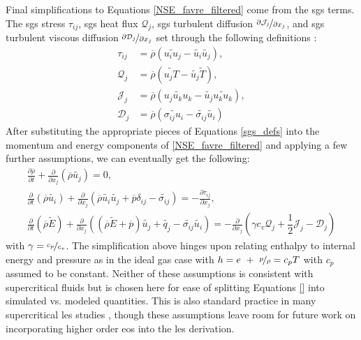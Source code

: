 Final simplifications to Equations \ref{NSE_favre_filtered} come from the \gls{sgs} terms. The \gls{sgs} stress $\tau_{ij}$, \gls{sgs} heat flux $\mathcal{Q}_j$, \gls{sgs} turbulent diffusion $\nicefrac{\partial \mathcal{J}_j}{\partial x_j}$, and \gls{sgs} turbulent viscous diffusion $\nicefrac{\partial \mathcal{D}_j}{\partial x_j}$ set through the following definitions \cite{}:
\begin{equation} \label{sgs_defs}
\begin{aligned}
\tau_{ij} &= \overline{\rho}\left(\widetilde{u_i u_j} - \widetilde{u_i}\widetilde{u_j} \right), \\
\mathcal{Q}_{j} &= \overline{\rho}\left(\widetilde{u_j T} - \widetilde{u_j}\widetilde{T} \right), \\
\mathcal{J}_{j} &= \overline{\rho}\left(\widetilde{u_j u_k u_k} - \widetilde{u_j}\widetilde{u_k u_k} \right), \\
\mathcal{D}_{j} &= \overline{\rho}\left(\widetilde{\sigma_{ij}u_i} - \widetilde{\sigma_{ij}}\widetilde{u_i} \right)
\end{aligned}
\end{equation} 
After substituting the appropriate pieces of Equations \ref{sgs_defs} into the momentum and energy components of \ref{NSE_favre_filtered} and applying a few further assumptions, we can eventually get the following:
\begin{subequations}
\begin{align}
  \frac{\partial\overline{\rho}}{\partial t} + \frac{\partial }{\partial x_j} \left( \overline{\rho}\widetilde{ u_j} \right) = 0, \label{NSE_mass_sgs} \\
  \frac{\partial}{\partial t} \left( \overline{\rho}\widetilde{ u_i }\right) + \frac{\partial}{\partial x_j} \left(\overline{\rho}\widetilde{ u_i} \widetilde{u_j} + \overline{p }\delta_{ij} - \widetilde{\sigma_{ij}} \right) = - \frac{\partial \tau_{ij}}{\partial x_j}, \label{NSE_mom_sgs}  \\
  \frac{\partial}{\partial t} \left( \overline{\rho}\widetilde{ E} \right) + \frac{\partial}{\partial x_j} \left(\left( \overline{\rho}\widetilde{ E}+\overline{p} \right)\widetilde{u_j} + \widetilde{q_j} - \widetilde{\sigma_{ij}}\widetilde{ u_i}\right) = - \frac{\partial}{\partial x_j } \left( \gamma c_v \mathcal{Q}_j + \dfrac{1}{2} \mathcal{J}_j - \mathcal{D}_j \right)  \label{NSE_E_sgs}
\end{align}
\end{subequations}
with $\gamma = \nicefrac{c_p}{c_v}$. The simplification above hinges upon relating enthalpy to internal energy and pressure as in the ideal gas case with $h = e ~+~ \nicefrac{p}{\rho} = c_p T$ with $c_p$ assumed to be constant. Neither of these assumptions is consistent with supercritical fluids but is chosen here for ease of splitting Equations \ref{} into simulated vs. modeled quantities. This is also standard practice in many supercritical \gls{les} studies \cite{}, though these assumptions leave room for future work on incorporating higher order \gls{eos} into the \gls{les} derivation. 

